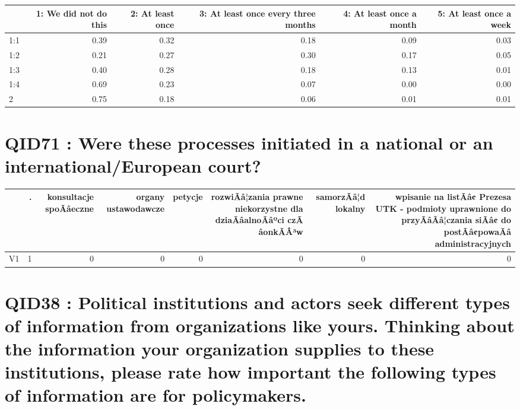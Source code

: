 \documentclass[]{article}
\begin{document}
\begin{table}[H]
\centering\begingroup\fontsize{30}{32}\selectfont

\begin{tabular}{l|r|r|r|r|r}
\hline
  & 1: We did not do this &  2: At least once &  3: At least once every three months &  4: At least once a month &  5: At least once a week\\
\hline
1:1 & 0.39 & 0.32 & 0.18 & 0.09 & 0.03\\
\hline
1:2 & 0.21 & 0.27 & 0.30 & 0.17 & 0.05\\
\hline
1:3 & 0.40 & 0.28 & 0.18 & 0.13 & 0.01\\
\hline
1:4 & 0.69 & 0.23 & 0.07 & 0.00 & 0.00\\
\hline
2 & 0.75 & 0.18 & 0.06 & 0.01 & 0.01\\
\hline
\end{tabular}
\endgroup{}
\end{table}

\section{QID71 : Were these processes initiated in a national or an
international/European
court?}\label{qid71-were-these-processes-initiated-in-a-national-or-an-internationaleuropean-court}

\begin{tabular}{l|r|r|r|r|r|r|r}
\hline
  & . & konsultacje spoÃâeczne & organy ustawodawcze & petycje & rozwiÃâ¦zania prawne niekorzystne dla dziaÃâalnoÃâºci czÃâonkÃÂ³w & samorzÃâ¦d lokalny & wpisanie na listÃâ¢ Prezesa UTK - podmioty uprawnione do przyÃâÃâ¦czania siÃâ¢ do postÃâ¢powaÃâ administracyjnych\\
\hline
V1 & 1 & 0 & 0 & 0 & 0 & 0 & 0\\
\hline
\end{tabular}

\section{QID38 : Political institutions and actors seek different types
of information from organizations like yours. Thinking about the
information your organization supplies to these institutions, please
rate how important the following types of information are for
policymakers.}\label{qid38-political-institutions-and-actors-seek-different-types-of-information-from-organizations-like-yours.-thinking-about-the-information-your-organization-supplies-to-these-institutions-please-rate-how-important-the-following-types-of-information-are-for-policymakers.}
\end{document}
